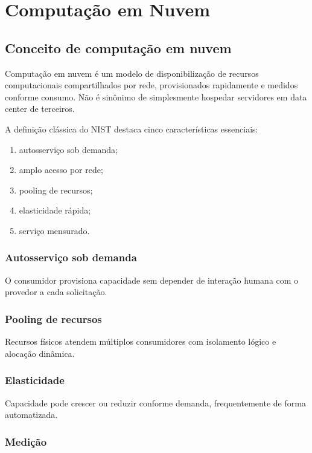 \chapter{Computação em Nuvem}

\section{Conceito de computação em nuvem}

Computação em nuvem é um modelo de disponibilização de recursos computacionais compartilhados por rede, provisionados rapidamente e medidos conforme consumo. Não é sinônimo de simplesmente hospedar servidores em data center de terceiros.

A definição clássica do NIST destaca cinco características essenciais:
\begin{enumerate}
\item autosserviço sob demanda;
\item amplo acesso por rede;
\item pooling de recursos;
\item elasticidade rápida;
\item serviço mensurado.
\end{enumerate}

\subsection{Autosserviço sob demanda}

O consumidor provisiona capacidade sem depender de interação humana com o provedor a cada solicitação.

\subsection{Pooling de recursos}

Recursos físicos atendem múltiplos consumidores com isolamento lógico e alocação dinâmica.

\subsection{Elasticidade}

Capacidade pode crescer ou reduzir conforme demanda, frequentemente de forma automatizada.

\subsection{Medição}

